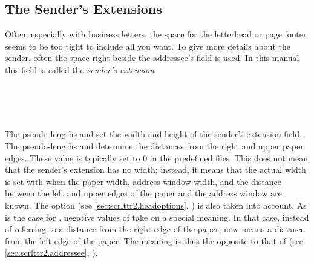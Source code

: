 \subsection{The Sender's Extensions}
\label{sec:scrlttr2.locationField}

Often, especially with business letters, the space for the letterhead
or page footer seems to be too tight to include all you want. To give
more details about the sender, often the space right beside the
addressee's field is used. In this manual this field is called the
\emph{sender's extension}


\begin{Declaration}
  \\
  \\
  \\
\end{Declaration}
%
%
%
%
The pseudo-lengths  and
 set the width
and height of the sender's extension field. The pseudo-lengths
 and  determine the distances from
the right and upper paper edges. These value is typically set to
0 in the predefined  files. This does not mean that
the sender's extension has no width; instead, it means that the actual
width is set with  when the paper width, address window
width, and the distance between the left and upper edges of the paper
and the address window are known. The option  (see
\autoref{sec:scrlttr2.headoptions},
) is also taken into
account. As is the case for , negative values of
 take on a special meaning. In that case, instead of
referring to a distance from the right edge of the paper,
 now means a distance from the left edge of the
paper. The meaning is thus the opposite to that of
 (see \autoref{sec:scrlttr2.addressee},
).
%
%
%
%


